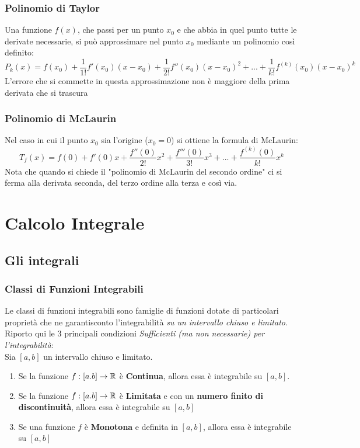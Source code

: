 \documentclass[12pt, a4paper, openany]{book}
\begin{document}
	\subsection*{Polinomio di Taylor}
	Una funzione $f(x)$, che passi per un punto $x_0$ e che abbia in quel punto tutte le derivate necessarie,
	si può approssimare nel punto $x_0$ mediante un polinomio così definito:
	$$P_k(x)=f(x_0)+\frac{1}{1!}f'(x_0)(x-x_0) + \frac{1}{2!}f''(x_0)(x-x_0)^2 +... + \frac{1}{k!}f^{(k)}(x_0)(x-x_0)^k$$
	L'errore che si commette in questa approssimazione non è maggiore della prima derivata che si trascura
	\subsection*{Polinomio di McLaurin}
	Nel caso in cui il punto $x_0$ sia l'origine ($x_0=0$) si ottiene la formula di McLaurin:
	$$T_f(x) = f(0) + f'(0)x + \frac{f''(0)}{2!}x^2 + \frac{f'''(0)}{3!}x^3+...+ \frac{f^{(k)}(0)}{k!}x^k$$
	Nota che quando si chiede il "polinomio di McLaurin del secondo ordine" ci si ferma alla derivata seconda, del terzo ordine alla terza e così via.
	\chapter{Calcolo Integrale}
	\section{Gli integrali}
	\subsection{Classi di Funzioni Integrabili}
	Le classi di funzioni integrabili sono famiglie di funzioni dotate di particolari proprietà che ne garantisconto l'integrabilità \emph{su un intervallo chiuso e limitato}.
	Riporto qui le 3 principali condizioni \emph{Sufficienti (ma non necessarie) per l'integrabilità}:
	\\Sia $[a,b]$ un intervallo chiuso e limitato.
	\begin{enumerate}
		\item Se la funzione $f:[a.b] \to \mathbb{R}$ è \textbf{Continua}, allora essa è integrabile su $[a,b]$.
		\item Se la funzione $f:[a.b] \to \mathbb{R}$ è \textbf{Limitata} e con un \textbf{numero finito di discontinuità}, allora essa è integrabile su $[a,b]$
		\item Se una funzione $f$ è \textbf{Monotona} e definita in $[a,b]$, allora essa è integrabile su $[a,b]$ 
	\end{enumerate}
\end{document}

